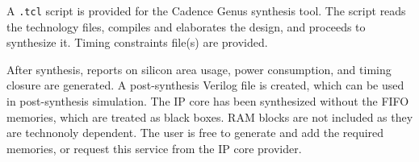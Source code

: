 %

A {\tt .tcl} script is provided for the Cadence Genus synthesis tool. The script
reads the technology files, compiles and elaborates the design, and proceeds to
synthesize it. Timing constraints file(s) are provided.

After synthesis, reports on silicon area usage, power consumption, and timing
closure are generated. A post-synthesis Verilog file is created, which can be
used in post-synthesis simulation. The IP core has been synthesized without the
FIFO memories, which are treated as black boxes. RAM blocks are not included as
they are technonoly dependent. The user is free to generate and add the required
memories, or request this service from the IP core provider.
